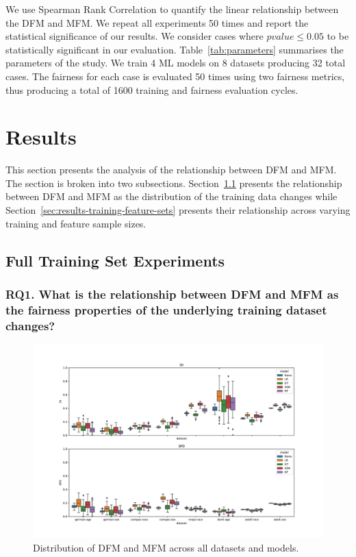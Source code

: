 \documentclass{article}
\begin{document}
We use Spearman Rank Correlation to quantify the linear relationship
between the DFM and MFM. We repeat all experiments 50 times and report
the statistical significance of our results. We consider cases where
$pvalue\le0.05$ to be statistically significant in our
evaluation. Table \ref{tab:parameters} summarises the parameters of
the study. We train 4 ML models on 8 datasets producing 32 total
cases. The fairness for each case is evaluated 50 times using two
fairness metrics, thus producing a total of 1600 training and fairness
evaluation cycles.

\section{Results}\label{sec:results}

This section presents the analysis of the relationship between DFM and
MFM. The section is broken into two
subsections. Section \ref{sec:results-full} presents the relationship
between DFM and MFM as the distribution of the training data changes
while Section \ref{sec:results-training-feature-sets} presents their
relationship across varying training and feature sample sizes.

\subsection{Full Training Set Experiments}\label{sec:results-full}
\subsubsection{RQ1. What is the relationship between DFM and MFM as
the fairness properties of the underlying training dataset changes?}\label{sec:results-full-rel}

\begin{figure}
  \centering
  \includegraphics[width=\linewidth]{boxplot--dataset--di-spd--exp-full.pdf}
  \caption{Distribution of DFM and MFM across all datasets and models.}
  \label{fig:boxplot--dataset--di-spd--exp-full}
\end{figure}
\end{document}
